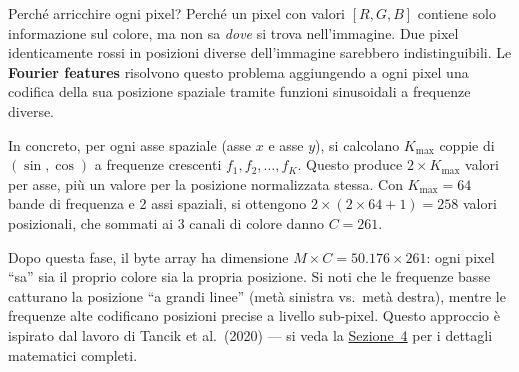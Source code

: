 \documentclass[12pt,a4paper]{article}
\begin{document}
Perch\'e arricchire ogni pixel? Perch\'e un pixel con valori $[R, G, B]$ contiene solo informazione sul colore, ma non sa \textit{dove} si trova nell'immagine. Due pixel identicamente rossi in posizioni diverse dell'immagine sarebbero indistinguibili. Le \textbf{Fourier features} risolvono questo problema aggiungendo a ogni pixel una codifica della sua posizione spaziale tramite funzioni sinusoidali a frequenze diverse.

In concreto, per ogni asse spaziale (asse $x$ e asse $y$), si calcolano $K_{\max}$ coppie di $(\sin, \cos)$ a frequenze crescenti $f_1, f_2, \ldots, f_K$. Questo produce $2 \times K_{\max}$ valori per asse, pi\`u un valore per la posizione normalizzata stessa. Con $K_{\max} = 64$ bande di frequenza e 2 assi spaziali, si ottengono $2 \times (2 \times 64 + 1) = 258$ valori posizionali, che sommati ai 3 canali di colore danno $C = 261$.

Dopo questa fase, il byte array ha dimensione $M \times C = 50.176 \times 261$: ogni pixel ``sa'' sia il proprio colore sia la propria posizione. Si noti che le frequenze basse catturano la posizione ``a grandi linee'' (met\`a sinistra vs.\ met\`a destra), mentre le frequenze alte codificano posizioni precise a livello sub-pixel. Questo approccio \`e ispirato dal lavoro di Tancik et al.\ (2020) --- si veda la \hyperref[sec:fourier]{Sezione~4} per i dettagli matematici completi.




\end{document}
